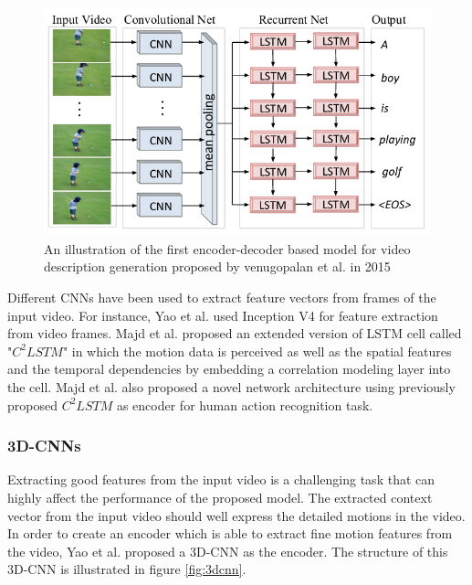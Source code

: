 \documentclass[preprint, 12pt]{elsarticle}
\begin{document}
		\begin{figure}[h]
			\centering
			\includegraphics[scale=0.5]{Imgs/vid1.png}
			\caption{An illustration of the first encoder-decoder based model for video description generation proposed by venugopalan et al. in 2015 \cite{venugopalan2014translating}}
			\label{fig:vid1}
		\end{figure}
	
		Different CNNs have been used to extract feature vectors from frames of the input video. For instance, Yao et al. \cite{yao2017boosting} used Inception V4 \cite{szegedy2017inception} for feature extraction from video frames. Majd et al. \cite{majd2018correlation} proposed an extended version of LSTM cell called "\textit{$C^2LSTM$}" in which the motion data is perceived as well as the spatial features and the temporal dependencies by embedding a correlation modeling layer into the cell. Majd et al. \cite{majd2019motion} also proposed a novel network architecture using previously proposed $C^2LSTM$ as encoder for human action recognition task.
	
		\subsubsection{3D-CNNs}
		Extracting good features from the input video is a challenging task that can highly affect the performance of the proposed model. The extracted context vector from the input video should well express the detailed motions in the video. In order to create an encoder which is able to extract fine motion features from the video, Yao et al. \cite{yao2015describing} proposed a 3D-CNN as the encoder. The structure of this 3D-CNN is illustrated in figure \ref{fig:3dcnn}.
		
\end{document}
